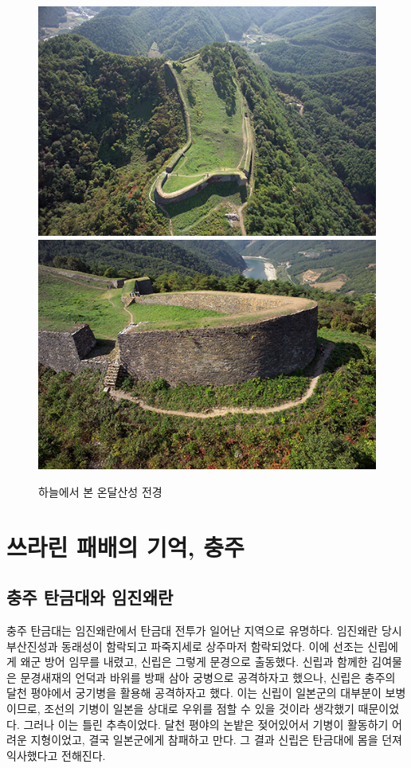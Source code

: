 \begin{figure}
    \centering
    \includegraphics[width=.4\textwidth]{s_img/온달산성_사진.JPG}
    \includegraphics[width=.4\textwidth]{s_img/온달산성_사진2.JPG}
    \caption{하늘에서 본 온달산성 전경}
    \label{fig:my_label_s5}
 \end{figure}

\section{쓰라린 패배의 기억, 충주}
\subsection{충주 탄금대와 임진왜란}
충주 탄금대는 임진왜란에서 탄금대 전투가 일어난 지역으로 유명하다. 임진왜란 당시 부산진성과 동래성이 함락되고 파죽지세로 상주마저 함락되었다. 이에 선조는 신립에게 왜군 방어 임무를 내렸고, 신립은 그렇게 문경으로 출동했다. 신립과 함께한 김여물은 문경새재의 언덕과 바위를 방패 삼아 궁병으로 공격하자고 했으나, 신립은 충주의 달천 평야에서 궁기병을 활용해 공격하자고 했다. 이는 신립이 일본군의 대부분이 보병이므로, 조선의 기병이 일본을 상대로 우위를 점할 수 있을 것이라 생각했기 때문이었다. 그러나 이는 틀린 추측이었다. 달천 평야의 논밭은 젖어있어서 기병이 활동하기 어려운 지형이었고, 결국 일본군에게 참패하고 만다. 그 결과 신립은 탄금대에 몸을 던져 익사했다고 전해진다. 
